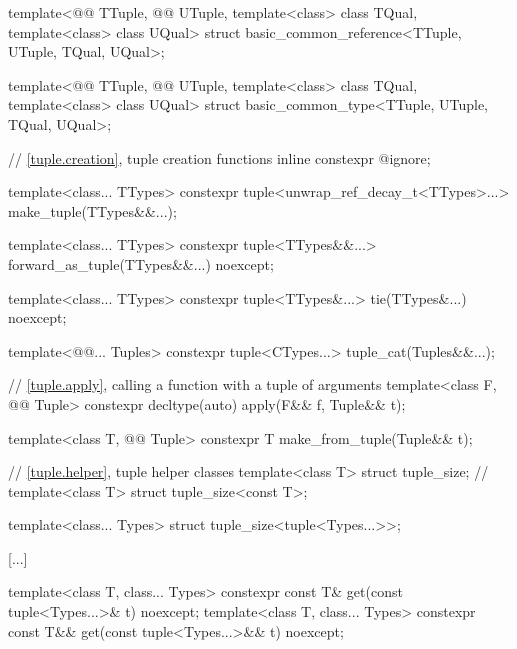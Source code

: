 \documentclass{wg21}
\begin{document}
\begin{addedblock}
\begin{codeblock}
template<@@ TTuple, @@ UTuple, template<class> class TQual, template<class> class UQual>
struct basic_common_reference<TTuple, UTuple, TQual, UQual>;

template<@@ TTuple, @@ UTuple, template<class> class TQual, template<class> class UQual>
struct basic_common_type<TTuple, UTuple, TQual, UQual>;
\end{codeblock}
\end{addedblock}
\begin{codeblock}
[...]


// \ref{tuple.creation}, tuple creation functions
inline constexpr @\unspec@ ignore;

template<class... TTypes>
constexpr tuple<unwrap_ref_decay_t<TTypes>...> make_tuple(TTypes&&...);

template<class... TTypes>
constexpr tuple<TTypes&&...> forward_as_tuple(TTypes&&...) noexcept;

template<class... TTypes>
constexpr tuple<TTypes&...> tie(TTypes&...) noexcept;

template<@@... Tuples>
constexpr tuple<CTypes...> tuple_cat(Tuples&&...);

// \ref{tuple.apply}, calling a function with a tuple of arguments
template<class F, @@ Tuple>
constexpr decltype(auto) apply(F&& f, Tuple&& t);

template<class T, @@ Tuple>
constexpr T make_from_tuple(Tuple&& t);

// \ref{tuple.helper}, tuple helper classes
template<class T> struct tuple_size;                  // \notdef
template<class T> struct tuple_size<const T>;

template<class... Types> struct tuple_size<tuple<Types...>>;

[...]

template<class T, class... Types>
constexpr const T& get(const tuple<Types...>& t) noexcept;
template<class T, class... Types>
constexpr const T&& get(const tuple<Types...>&& t) noexcept;
\end{codeblock}
\end{document}
